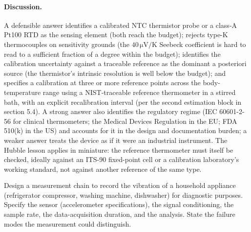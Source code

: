 \paragraph{Discussion.} A defensible answer identifies a calibrated
NTC thermistor probe or a class-A Pt100 RTD as the sensing element
(both reach the budget); rejects type-K thermocouples on
sensitivity grounds (the $40 \,\si{\micro\volt\per\kelvin}$ Seebeck
coefficient is hard to read to a sufficient fraction of a degree
within the budget); identifies the calibration uncertainty against
a traceable reference as the dominant a posteriori source (the
thermistor's intrinsic resolution is well below the budget); and
specifies a calibration at three or more reference points across
the body-temperature range using a NIST-traceable reference
thermometer in a stirred bath, with an explicit recalibration
interval (per the second estimation block in section 5.4). A
strong answer also identifies the regulatory regime (IEC 60601-2-56
for clinical thermometers; the Medical Devices Regulation in the
EU; FDA 510(k) in the US) and accounts for it in the design and
documentation burden; a weaker answer treats the device as if it
were an industrial instrument. The Hubble lesson applies in
miniature: the reference thermometer must itself be checked, ideally
against an ITS-90 fixed-point cell or a calibration laboratory's
working standard, not against another reference of the same type.

\begin{exercise}
Design a measurement chain to record the vibration of a household
appliance (refrigerator compressor, washing machine, dishwasher) for
diagnostic purposes. Specify the sensor (accelerometer
specifications), the signal conditioning, the sample rate, the
data-acquisition duration, and the analysis. State the failure
modes the measurement could distinguish.
\end{exercise}

